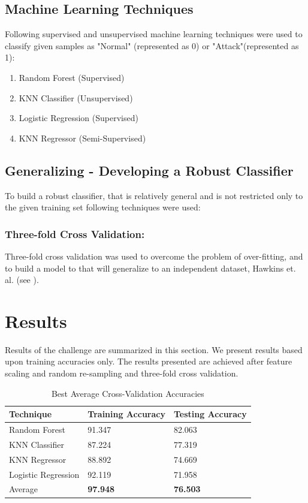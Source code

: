 \documentclass{llncs}
\begin{document}
\subsection{Machine Learning Techniques}
Following supervised and unsupervised machine learning techniques were used to classify given samples as "Normal" (represented as 0) or "Attack"(represented as 1):
\begin{enumerate}
   \item Random Forest (Supervised)
   \item KNN Classifier (Unsupervised)
   \item Logistic Regression (Supervised)
   \item KNN Regressor (Semi-Supervised)
 \end{enumerate}
 
\subsection{Generalizing - Developing a Robust Classifier}
To build a robust classifier, that is relatively general and is not restricted only to the given training set following techniques were used:

\subsubsection{Three-fold Cross Validation:} Three-fold cross validation was used to overcome the problem of over-fitting, and to build a model to that will generalize to an independent dataset, Hawkins et. al. (see \cite{hawkins:eke}).  


\section{Results}
Results of the challenge are summarized in this section. We present results based upon training accuracies only. The results presented are achieved after feature scaling and random re-sampling and three-fold cross validation.

\begin{table}
	\centering
	\caption{Best Average Cross-Validation Accuracies}
	\begin{tabular}{ |p{3cm}||p{3cm}||p{3cm}|}
		\hline
		Technique                  &Training Accuracy &Testing Accuracy\\
		\hline
		Random Forest              &91.347 &82.063\\
		KNN Classifier             &87.224 &77.319\\
		KNN Regressor              &88.892 &74.669\\
		Logistic Regression        &92.119 &71.958\\
		\hline
		 Average     &\textbf{97.948} &\textbf{76.503}\\
		 \hline
	\end{tabular}
	\label{table}
\end{table}
\end{document}

